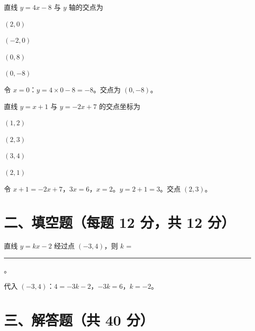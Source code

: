 \documentclass{exam-zh}
\begin{document}
\begin{question}[points=12]
  直线 $y = 4x - 8$ 与 $y$ 轴的交点为
  \begin{choices}
    \item $(2, 0)$
    \item $(-2, 0)$
    \item $(0, 8)$
    \item $(0, -8)$
  \end{choices}
  \paren[D]
  \begin{solutionblock}
    令 $x=0$：$y=4 \times 0 - 8 = -8$。交点为 $(0, -8)$。
  \end{solutionblock}
\end{question}



\begin{question}[points=12]
  直线 $y = x + 1$ 与 $y = -2x + 7$ 的交点坐标为
  \begin{choices}
    \item $(1, 2)$
    \item $(2, 3)$
    \item $(3, 4)$
    \item $(2, 1)$
  \end{choices}
  \paren[B]
  \begin{solutionblock}
    令 $x+1=-2x+7$，$3x=6$，$x=2$。$y=2+1=3$。交点 $(2, 3)$。
  \end{solutionblock}
\end{question}


\section*{二、填空题（每题 12 分，共 12 分）}



\begin{question}[points=12]
  直线 $y = kx - 2$ 经过点 $(-3, 4)$，则 $k$ = \rule{3cm}{0.4pt}。
  \fillin
  \paren[$-2$]
  \begin{solutionblock}
    代入 $(-3, 4)$：$4 = -3k - 2$，$-3k = 6$，$k = -2$。
  \end{solutionblock}
\end{question}


\section*{三、解答题（共 40 分）}




\end{document}
